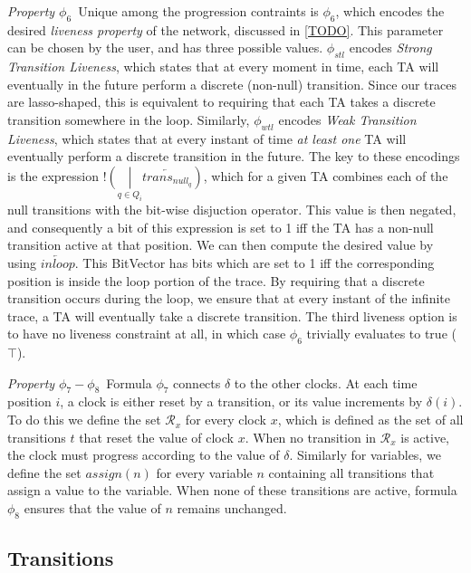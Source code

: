 \documentclass[a4paper,12pt]{article}
\newcommand*\BitOr{\mathbin{|}}
\newcommand{\BitNeg}{!}
\begin{document}
\emph{Property $\phi_6$}\ Unique among the progression contraints is $\phi_{6}$,
which encodes the desired \emph{liveness property} of the network, discussed in
\ref{TODO}. This parameter can be chosen by the user, and has three possible
values. $\phi_{stl}$ encodes \emph{Strong Transition Liveness}, which states
that at every moment in time, each TA will eventually in the future perform a
discrete (non-null) transition. Since our traces are lasso-shaped, this is
equivalent to requiring that each TA takes a discrete transition somewhere in
the loop. Similarly, $\phi_{wtl}$ encodes \emph{Weak Transition Liveness}, which
states that at every instant of time \emph{at least one} TA will eventually
perform a discrete transition in the future. The key to these encodings is the
expression
\(\BitNeg (\underset{q \in Q_{i}}{\BitOr} \overleftarrow{trans_{null_{q}}})\),
which for a given TA combines each of the null transitions with the bit-wise
disjuction operator. This value is then negated, and consequently a bit of this
expression is set to 1 iff the TA has a non-null transition active at that
position. We can then compute the desired value by using
\(\overleftarrow{inloop}\). This BitVector has bits which are set to 1 iff the
corresponding position is inside the loop portion of the trace. By requiring
that a discrete transition occurs during the loop, we ensure that at every
instant of the infinite trace, a TA will eventually take a discrete
transition. The third liveness option is to have no liveness constraint at all,
in which case $\phi_{6}$ trivially evaluates to true ($\top$).

\emph{Property $\phi_7 - \phi_{8}$}\ Formula \(\phi_7\) connects \(\delta\) to
the other clocks. At each time position \(i\), a clock is either reset by a
transition, or its value increments by \(\delta(i)\). To do this we define the
set \(\mathcal{R}_x\) for every clock \(x\), which is defined as the set of all
transitions \(t\) that reset the value of clock \(x\). When no transition in
\(\mathcal{R}_x\) is active, the clock must progress according to the value of
\(\delta\). Similarly for variables, we define the set \(assign(n)\) for every
variable \(n\) containing all transitions that assign a value to the variable.
When none of these transitions are active, formula \(\phi_8\) ensures that the
value of \(n\) remains unchanged.

\subsection{Transitions}\label{consstraints-trans}
\end{document}
